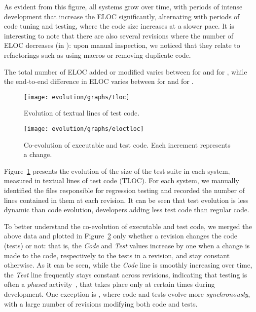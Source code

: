 
As evident from this figure, all \numSystems systems grow over time,
with periods of intense development that increase the ELOC
significantly, alternating with periods of code tuning and testing,
where the code size increases at a slower pace.  It is interesting to
note that there are also several revisions where the number of ELOC
decreases (\eg in \zeromq): upon manual inspection, we noticed that
they relate to refactorings such as using macros or removing duplicate
code.


The total number of ELOC added or modified varies
between \redisPatchTotal for \redis and \lighttpdtwoPatchTotal
for \lighttpdtwo, while the end-to-end difference in ELOC varies
between \beanstalkdDeltaSize for \beanstalkd and \lighttpdtwoDeltaSize
for \lighttpdtwo.

\begin{figure}[t]
\centering
\texttt{[image: evolution/graphs/tloc]}
\caption{Evolution of textual lines of test code.}
\label{fig:tloc-evol}
\end{figure}


\begin{figure}[t]
\centering
\texttt{[image: evolution/graphs/eloctloc]}
\caption{Co-evolution of executable and test code. Each increment represents a change.}
\label{fig:coeloctloc}
\end{figure}


Figure~\ref{fig:tloc-evol} presents the evolution of the size of the
test suite in each system, measured in textual lines of test code
(TLOC).  For each system, we manually identified the files responsible
for regression testing and recorded the number of lines contained in
them at each revision. It can be seen that test evolution is less
dynamic than code evolution, developers adding less test code than
regular code.


To better understand the co-evolution of executable and test code, we
merged the above data and plotted in Figure~\ref{fig:coeloctloc}
only whether a revision changes the code (tests) or not: that is,
the \emph{Code} and \emph{Test} values increase by one when a change is
made to the code, respectively to the tests in a revision, and stay constant
otherwise.  As it can be seen, while the \emph{Code} line is smoothly
increasing over time, the \emph{Test} line frequently stays constant
across revisions, indicating that testing is often a \textit{phased}
activity~\cite{coevol:emse11}, that takes place only at certain times
during development. One exception is \git, where code and
tests evolve more \textit{synchronously}, with a large number of
revisions modifying both code and tests.

